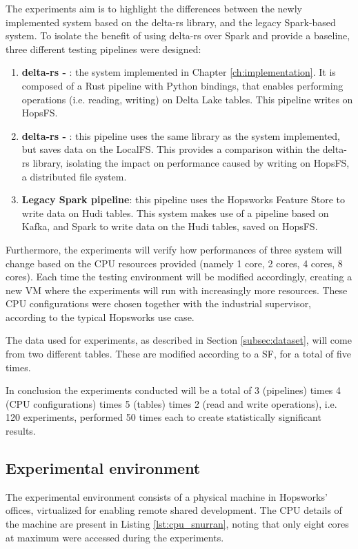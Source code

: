 The experiments aim is to highlight the differences between the newly implemented system based on the delta-rs library, and the legacy Spark-based system. To isolate the benefit of using delta-rs over Spark and provide a baseline, three different testing pipelines were designed:
\begin{enumerate}
    \item \textbf{delta-rs - }: the system implemented in Chapter \ref{ch:implementation}. It is composed of a Rust pipeline with Python bindings, that enables performing operations (i.e. reading, writing) on Delta Lake tables. This pipeline writes on \gls{HopsFS}.
    \item \textbf{delta-rs - }: this pipeline uses the same library as the system implemented, but saves data on the \gls{LocalFS}. This provides a comparison within the delta-rs library, isolating the impact on performance caused by writing on \gls{HopsFS}, a distributed file system.
    \item \textbf{Legacy Spark pipeline}: this pipeline uses the Hopsworks Feature Store to write data on Hudi tables. This system makes use of a pipeline based on Kafka, and Spark to write data on the Hudi tables, saved on \gls{HopsFS}. 
\end{enumerate}

Furthermore, the experiments will verify how performances of three system will change based on the \gls{CPU} resources provided (namely 1 core, 2 cores, 4 cores, 8 cores). Each time the testing environment will be modified accordingly, creating a new \gls{VM} where the experiments will run with increasingly more resources. These \gls{CPU} configurations were chosen together with the industrial supervisor, according to the typical Hopsworks use case.

The data used for experiments, as described in Section \ref{subsec:dataset}, will come from two different tables. These are modified according to a \gls{SF}, for a total of five times.

In conclusion the experiments conducted will be a total of 3 (pipelines) times 4 (\gls{CPU} configurations) times 5 (tables) times 2 (read and write operations), i.e. 120 experiments, performed 50 times each to create statistically significant results.

\subsection{Experimental environment}
The experimental environment consists of a physical machine in Hopsworks' offices, virtualized for enabling remote shared development. The \gls{CPU} details of the machine are present in Listing \ref{lst:cpu_snurran}, noting that only eight cores at maximum were accessed during the experiments.

